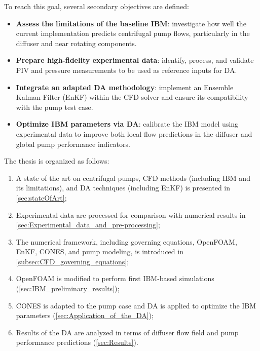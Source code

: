 To reach this goal, several secondary objectives are defined:

\begin{itemize}
    \item \textbf{Assess the limitations of the baseline IBM}: investigate how well the current implementation predicts centrifugal pump flows, particularly in the diffuser and near rotating components.
    \item \textbf{Prepare high-fidelity experimental data}: identify, process, and validate PIV and pressure measurements to be used as reference inputs for DA.
    \item \textbf{Integrate an adapted DA methodology}: implement an Ensemble Kalman Filter (EnKF) within the CFD solver and ensure its compatibility with the pump test case.
    \item \textbf{Optimize IBM parameters via DA}: calibrate the IBM model using experimental data to improve both local flow predictions in the diffuser and global pump performance indicators.
\end{itemize}

The thesis is organized as follows:

\begin{enumerate}
    \item A state of the art on centrifugal pumps, CFD methods (including IBM and its limitations), and DA techniques (including EnKF) is presented in \autoref{sec:stateOfArt};
    \item Experimental data are processed for comparison with numerical results in \autoref{sec:Experimental_data_and_pre-processing};
    \item The numerical framework, including governing equations, OpenFOAM, EnKF, CONES, and pump modeling, is introduced in \autoref{subsec:CFD_governing_equations};
    \item OpenFOAM is modified to perform first IBM-based simulations (\autoref{sec:IBM_preliminary_results});
    \item CONES is adapted to the pump case and DA is applied to optimize the IBM parameters (\autoref{sec:Application_of_the_DA});
    \item Results of the DA are analyzed in terms of diffuser flow field and pump performance predictions (\autoref{sec:Results}).
\end{enumerate}

